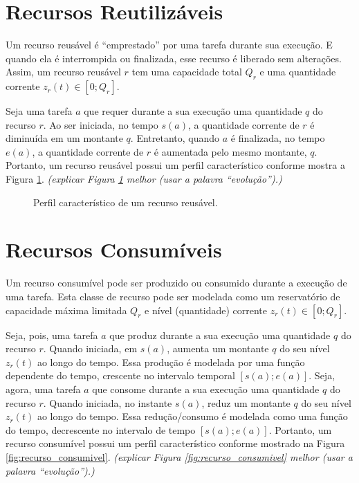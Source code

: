     \section{Recursos Reutilizáveis} \label{sec:recurso_reusavel}
    
        Um recurso reusável é ``emprestado'' por uma tarefa durante sua execução. E quando ela é interrompida ou finalizada, esse recurso é liberado sem alterações. Assim, um recurso reusável $r$ tem uma capacidade total $Q_r$ e uma quantidade corrente $z_r(t) \in [0; Q_r]$. 
        
        Seja uma tarefa $a$ que requer durante a sua execução uma quantidade $q$ do recurso $r$. Ao ser iniciada, no tempo $s(a)$, a quantidade corrente de $r$ é diminuída em um montante $q$. Entretanto, quando $a$ é finalizada, no tempo $e(a)$, a quantidade corrente de $r$ é aumentada pelo mesmo montante, $q$. Portanto, um recurso reusável possui um perfil característico conforme mostra a Figura \ref{fig:recurso_reusavel}. \emph{\color{red} (explicar Figura \ref{fig:recurso_reusavel} melhor (usar a palavra ``evolução'').)}
        
        \begin{figure}
            \centering
            
            \caption{Perfil característico de um recurso reusável.} \label{fig:recurso_reusavel}
        \end{figure}
    
    \section{Recursos Consumíveis} \label{sec:recurso_consumivel}
    
        Um recurso consumível pode ser produzido ou consumido durante a execução de uma tarefa. Esta classe de recurso pode ser modelada como um reservatório de capacidade máxima limitada $Q_r$ e nível (quantidade) corrente $z_r(t) \in [0; Q_r]$.
        
        Seja, pois, uma tarefa $a$ que produz durante a sua execução uma quantidade $q$ do recurso $r$. Quando iniciada, em $s(a)$, aumenta um montante $q$ do seu nível $z_r(t)$ ao longo do tempo. Essa produção é modelada por uma função dependente do tempo, crescente no intervalo temporal $[s(a); e(a)]$. Seja, agora, uma tarefa $a$ que consome durante a sua execução uma quantidade $q$ do recurso $r$. Quando iniciada, no instante $s(a)$, reduz um montante $q$ do seu nível $z_r(t)$ ao longo do tempo. Essa redução/consumo é modelada como uma função do tempo, decrescente no intervalo de tempo $[s(a); e(a)]$. Portanto, um recurso consumível possui um perfil característico conforme mostrado na Figura \ref{fig:recurso_consumivel}. \emph{\color{red} (explicar Figura \ref{fig:recurso_consumivel} melhor (usar a palavra ``evolução'').)}
        
